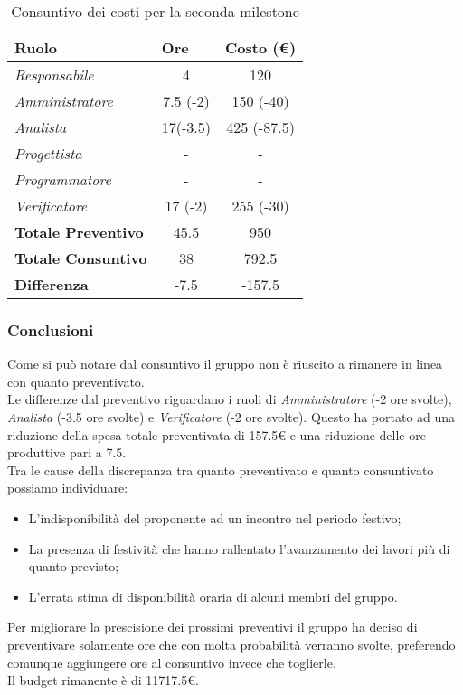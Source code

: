 \begin{table}[!ht]
    \centering
    \begin{tabular}{|l|c|c|}
    \hline
    \textbf{Ruolo} & \multicolumn{1}{l|}{\textbf{Ore}} & \multicolumn{1}{l|}{\textbf{Costo (€)}} \\ \hline
    \textit{Responsabile}      & 4         & 120         \\ \hline
    \textit{Amministratore}    & 7.5 (-2)  & 150 (-40)   \\ \hline
    \textit{Analista}          & 17(-3.5)  & 425 (-87.5) \\ \hline
    \textit{Progettista}       & -         & -           \\ \hline
    \textit{Programmatore}     & -         & -           \\ \hline
    \textit{Verificatore}      & 17 (-2)   & 255 (-30)   \\ \hline
    \textbf{Totale Preventivo} & 45.5      & 950         \\ \hline
    \textbf{Totale Consuntivo} & 38        & 792.5       \\ \hline
    \textbf{Differenza}        & -7.5      & -157.5      \\ \hline
    \end{tabular}
    \caption{Consuntivo dei costi per la seconda milestone}
\end{table}

\subsubsection{Conclusioni}
Come si può notare dal consuntivo il gruppo non è riuscito a rimanere in linea con quanto preventivato.
\\Le differenze dal preventivo riguardano i ruoli di \textit{Amministratore} (-2 ore svolte), \textit{Analista} (-3.5 ore svolte) e \textit{Verificatore} (-2 ore svolte).
Questo ha portato ad una riduzione della spesa totale preventivata di 157.5€ e una riduzione delle ore produttive pari a 7.5. 
\\Tra le cause della discrepanza tra quanto preventivato e quanto consuntivato possiamo individuare:
    \begin{itemize}
        \item L'indisponibilità del proponente ad un incontro nel periodo festivo;
        \item La presenza di festività che hanno rallentato l'avanzamento dei lavori più di quanto previsto;
        \item L'errata stima di disponibilità oraria di alcuni membri del gruppo.
    \end{itemize}
Per migliorare la prescisione dei prossimi preventivi il gruppo ha deciso di preventivare solamente ore che con molta probabilità verranno svolte,
preferendo comunque aggiungere ore al consuntivo invece che toglierle.
\\Il budget rimanente è di \num{11717,5}€.


